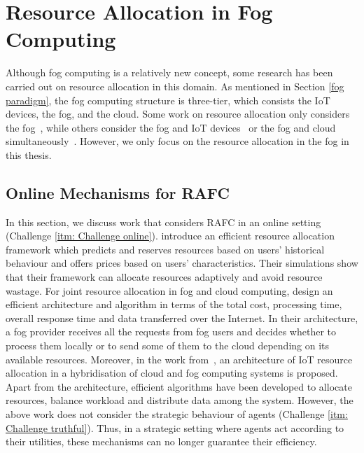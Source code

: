 \documentclass[11pt]{phdthesis}
\begin{document}
\section{Resource Allocation in Fog Computing} \label{resource-allocation-in-fog-computing}
Although fog computing is a relatively new concept, some research has been carried out on resource allocation in this domain. As mentioned in Section \ref{fog paradigm}, the fog computing structure is three-tier, which consists the IoT devices, the fog, and the cloud. Some work on resource allocation only considers the fog~\citep{oueis2015fog,aazam2015fog}, while others consider the fog and IoT devices~\citep{zeng2016joint} or the fog and cloud simultaneously~\citep{deng2015towards,agarwal2016efficient}. However, we only focus on the resource allocation in the fog in this thesis.

\subsection{Online Mechanisms for RAFC} \label{online-mechanisms-for-RAFC}

In this section, we discuss work that considers RAFC in an online setting (Challenge \ref{itm: Challenge online}). \citet{aazam2015fog} introduce an efficient resource allocation framework which predicts and reserves resources based on users' historical behaviour and offers prices based on users' characteristics. Their simulations show that their framework can allocate resources adaptively and avoid resource wastage. For joint resource allocation in fog and cloud computing, \citet{agarwal2016efficient} design an efficient architecture and algorithm in terms of the total cost, processing time, overall response time and data transferred over the Internet. In their architecture, a fog provider receives all the requests from fog users and decides whether to process them locally or to send some of them to the cloud depending on its available resources. Moreover, in the work from~\citet{alsaffar2016architecture}, an architecture of IoT resource allocation in a hybridisation of cloud and fog computing systems is proposed. Apart from the architecture, efficient algorithms have been developed to allocate resources, balance workload and distribute data among the system. However, the above work does not consider the strategic behaviour of agents (Challenge \ref{itm: Challenge truthful}). Thus, in a strategic setting where agents act according to their utilities, these mechanisms can no longer guarantee their efficiency.
\end{document}
